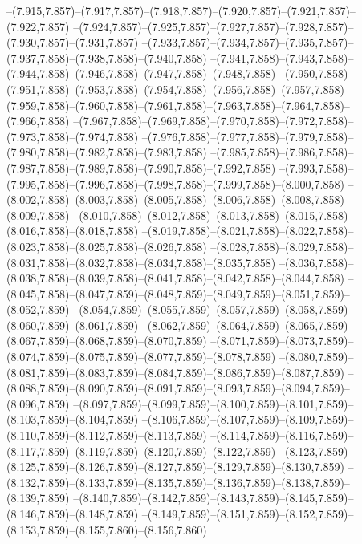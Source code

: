   --(7.915,7.857)--(7.917,7.857)--(7.918,7.857)--(7.920,7.857)--(7.921,7.857)--(7.922,7.857)%
  --(7.924,7.857)--(7.925,7.857)--(7.927,7.857)--(7.928,7.857)--(7.930,7.857)--(7.931,7.857)%
  --(7.933,7.857)--(7.934,7.857)--(7.935,7.857)--(7.937,7.858)--(7.938,7.858)--(7.940,7.858)%
  --(7.941,7.858)--(7.943,7.858)--(7.944,7.858)--(7.946,7.858)--(7.947,7.858)--(7.948,7.858)%
  --(7.950,7.858)--(7.951,7.858)--(7.953,7.858)--(7.954,7.858)--(7.956,7.858)--(7.957,7.858)%
  --(7.959,7.858)--(7.960,7.858)--(7.961,7.858)--(7.963,7.858)--(7.964,7.858)--(7.966,7.858)%
  --(7.967,7.858)--(7.969,7.858)--(7.970,7.858)--(7.972,7.858)--(7.973,7.858)--(7.974,7.858)%
  --(7.976,7.858)--(7.977,7.858)--(7.979,7.858)--(7.980,7.858)--(7.982,7.858)--(7.983,7.858)%
  --(7.985,7.858)--(7.986,7.858)--(7.987,7.858)--(7.989,7.858)--(7.990,7.858)--(7.992,7.858)%
  --(7.993,7.858)--(7.995,7.858)--(7.996,7.858)--(7.998,7.858)--(7.999,7.858)--(8.000,7.858)%
  --(8.002,7.858)--(8.003,7.858)--(8.005,7.858)--(8.006,7.858)--(8.008,7.858)--(8.009,7.858)%
  --(8.010,7.858)--(8.012,7.858)--(8.013,7.858)--(8.015,7.858)--(8.016,7.858)--(8.018,7.858)%
  --(8.019,7.858)--(8.021,7.858)--(8.022,7.858)--(8.023,7.858)--(8.025,7.858)--(8.026,7.858)%
  --(8.028,7.858)--(8.029,7.858)--(8.031,7.858)--(8.032,7.858)--(8.034,7.858)--(8.035,7.858)%
  --(8.036,7.858)--(8.038,7.858)--(8.039,7.858)--(8.041,7.858)--(8.042,7.858)--(8.044,7.858)%
  --(8.045,7.858)--(8.047,7.859)--(8.048,7.859)--(8.049,7.859)--(8.051,7.859)--(8.052,7.859)%
  --(8.054,7.859)--(8.055,7.859)--(8.057,7.859)--(8.058,7.859)--(8.060,7.859)--(8.061,7.859)%
  --(8.062,7.859)--(8.064,7.859)--(8.065,7.859)--(8.067,7.859)--(8.068,7.859)--(8.070,7.859)%
  --(8.071,7.859)--(8.073,7.859)--(8.074,7.859)--(8.075,7.859)--(8.077,7.859)--(8.078,7.859)%
  --(8.080,7.859)--(8.081,7.859)--(8.083,7.859)--(8.084,7.859)--(8.086,7.859)--(8.087,7.859)%
  --(8.088,7.859)--(8.090,7.859)--(8.091,7.859)--(8.093,7.859)--(8.094,7.859)--(8.096,7.859)%
  --(8.097,7.859)--(8.099,7.859)--(8.100,7.859)--(8.101,7.859)--(8.103,7.859)--(8.104,7.859)%
  --(8.106,7.859)--(8.107,7.859)--(8.109,7.859)--(8.110,7.859)--(8.112,7.859)--(8.113,7.859)%
  --(8.114,7.859)--(8.116,7.859)--(8.117,7.859)--(8.119,7.859)--(8.120,7.859)--(8.122,7.859)%
  --(8.123,7.859)--(8.125,7.859)--(8.126,7.859)--(8.127,7.859)--(8.129,7.859)--(8.130,7.859)%
  --(8.132,7.859)--(8.133,7.859)--(8.135,7.859)--(8.136,7.859)--(8.138,7.859)--(8.139,7.859)%
  --(8.140,7.859)--(8.142,7.859)--(8.143,7.859)--(8.145,7.859)--(8.146,7.859)--(8.148,7.859)%
  --(8.149,7.859)--(8.151,7.859)--(8.152,7.859)--(8.153,7.859)--(8.155,7.860)--(8.156,7.860)%
